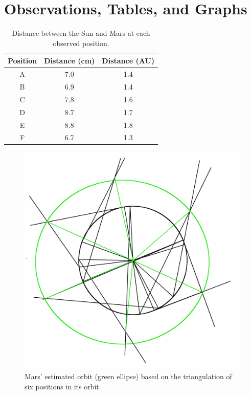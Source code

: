 \documentclass[11pt]{article}
\begin{document}
\section{Observations, Tables, and Graphs}
\begin{table}[h]
\caption{Distance between the Sun and Mars at each observed position.}
\begin{center}
\begin{tabular}{| c | c | c |}
	\hline
	Position & Distance (cm) & Distance (AU)\\ \hline
	A & 7.0 & 1.4 \\ \hline
	B & 6.9 & 1.4 \\ \hline
	C & 7.8 & 1.6 \\ \hline
	D & 8.7  & 1.7 \\ \hline
	E & 8.8 & 1.8 \\ \hline
	F & 6.7 & 1.3 \\
	\hline
\end{tabular}
\end{center}
\label{table:distances}
\end{table}

\begin{figure}[H]
\caption{Mars' estimated orbit (green ellipse) based on the triangulation of six positions in its orbit.}
\begin{center}
\includegraphics[scale=0.15]{figures/mars-orbit.png}
\end{center}
\label{fig:mars-orbit}
\end{figure}
\end{document}
